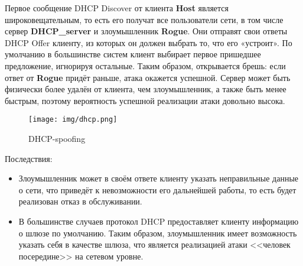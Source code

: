 Первое сообщение DHCP Discover от клиента \textbf{Host} является широковещательным, то есть его получат все пользователи сети, в том числе сервер \textbf{DHCP\_server} и злоумышленник \textbf{Rogue}. Они отправят свои ответы DHCP Offer клиенту, из которых он должен выбрать то, что его «устроит». По умолчанию в большинстве систем клиент выбирает первое пришедшее предложение, игнорируя остальные. Таким образом, открывается брешь: если ответ от \textbf{Rogue} придёт раньше, атака окажется успешной. Сервер может быть физически более удалён от клиента, чем злоумышленник, а также быть менее быстрым, поэтому вероятность успешной реализации атаки довольно высока.

\begin{figure}[H]
	\centering
	\texttt{[image: img/dhcp.png]}
	\caption{DHCP-spoofing}
\end{figure}


Последствия:

\begin{itemize}
	\item Злоумышленник может в своём ответе клиенту указать неправильные данные о сети, что приведёт к невозможности его дальнейшей работы, то есть будет реализован отказ в обслуживании.
	\item В большинстве случаев протокол DHCP предоставляет клиенту информацию о шлюзе по умолчанию. Таким образом, злоумышленник имеет возможность указать себя в качестве шлюза, что является реализацией атаки <<человек посередине>> на сетевом уровне.
\end{itemize}

